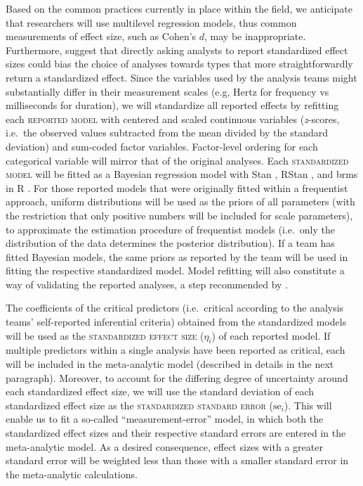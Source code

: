 \documentclass[Review,times,sageh]{sagej}
\begin{document}
Based on the common practices currently in place within the field, we anticipate that researchers will use multilevel regression models, thus common measurements of effect size, such as Cohen's \(d\), may be inappropriate.
Furthermore, \citet{aczel2021} suggest that directly asking analysts to report standardized effect sizes could bias the choice of analyses towards types that more straightforwardly return a standardized effect.
Since the variables used by the analysis teams might substantially differ in their measurement scales (e.g, Hertz for frequency vs milliseconds for duration), we will standardize all reported effects by refitting each \textsc{reported model} with centered and scaled continuous variables (\emph{z}-scores, i.e.~the observed values subtracted from the mean divided by the standard deviation) and sum-coded factor variables.
Factor-level ordering for each categorical variable will mirror that of the original analyses.
Each \textsc{standardized model} will be fitted as a Bayesian regression model with Stan \citep{stan2021}, RStan \citep{stan2020a}, and brms \citep{burkner2017} in R \citep{R-base}.
For those reported models that were originally fitted within a frequentist approach, uniform distributions will be used as the priors of all parameters (with the restriction that only positive numbers will be included for scale parameters), to approximate the estimation procedure of frequentist models (i.e.~only the distribution of the data determines the posterior distribution).
If a team has fitted Bayesian models, the same priors as reported by the team will be used in fitting the respective standardized model.
Model refitting will also constitute a way of validating the reported analyses, a step recommended by \citet{aczel2021}.

The coefficients of the critical predictors (i.e.~critical according to the analysis teams' self-reported inferential criteria) obtained from the standardized models will be used as the \textsc{standardized effect size} (\(\eta_i\)) of each reported model.
If multiple predictors within a single analysis have been reported as critical, each will be included in the meta-analytic model (described in details in the next paragraph).
Moreover, to account for the differing degree of uncertainty around each standardized effect size, we will use the standard deviation of each standardized effect size as the \textsc{standardized standard error} (\(\text{se}_i\)).
This will enable us to fit a so-called ``measurement-error'' model, in which both the standardized effect sizes and their respective standard errors are entered in the meta-analytic model.
As a desired consequence, effect sizes with a greater standard error will be weighted less than those with a smaller standard error in the meta-analytic calculations.
\end{document}
